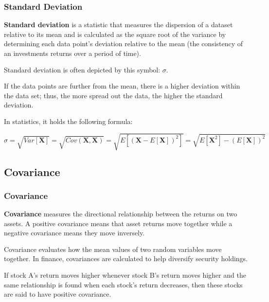\documentclass{beamer}
\begin{document}
\begin{frame}
\frametitle{\textbf{Standard Deviation}}

\begin{definition}
\justifying
\textbf{Standard deviation} is a statistic that measures the dispersion of a dataset relative to its mean and is calculated as the square root of the variance by determining each data point's deviation relative to the mean (the consistency of an investments returns over a period of time).
\end{definition}

\vspace{0.2cm}
\justifying
Standard deviation is often depicted by this symbol: $\sigma$.

\vspace{0.2cm}
\justifying
If the data points are further from the mean, there is a higher deviation within the data set; thus, the more spread out the data, the higher the standard deviation.

\vspace{0.2cm}
\justifying
In statistics, it holds the following  formula:

\begin{block}
\justifying
$$
\sigma = \sqrt{Var[\mathbf{X}]} = \sqrt{Cov(\mathbf{X},\mathbf{X})} = \sqrt{E[(\mathbf{X} - E[\mathbf{X}])^{2}]} = \sqrt{E[\mathbf{X}^{2}] - \left(E[\mathbf{X}]\right)^{2}}
$$
\end{block}

\end{frame}





\subsection{Covariance}

\begin{frame}
\frametitle{\textbf{Covariance}}

\begin{definition}
\justifying
\textbf{Covariance} measures the directional relationship between the returns on two assets. A positive covariance means that asset returns move together while a negative covariance means they move inversely.
\end{definition}

\vspace{0.8cm}
\justifying
Covariance evaluates how the mean values of two random variables move together. In finance, covariances are calculated to help diversify security holdings.

\vspace{0.8cm}
\justifying
If stock A's return moves higher whenever stock B's return moves higher and the same relationship is found when each stock's return decreases, then these stocks are said to have positive covariance.



\end{frame}
\end{document}
